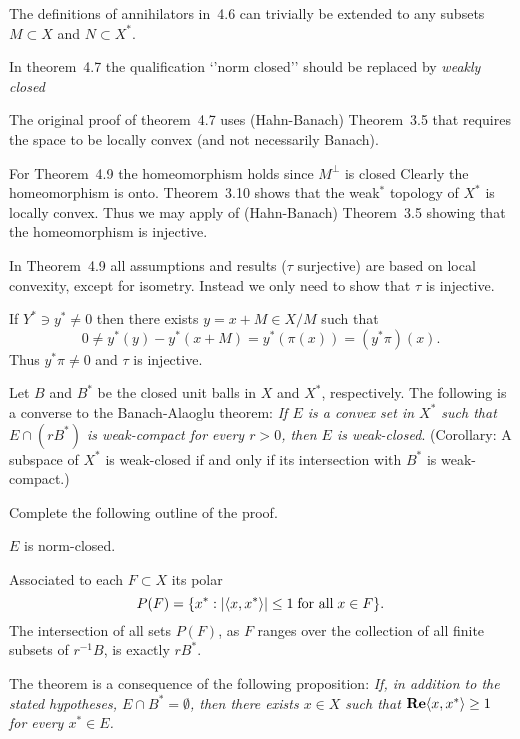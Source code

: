 \begin{enumerate}
The definitions of annihilators in~4.6 can trivially be extended
to any subsets \(M\subset X\) and \(N \subset X^*\).

In theorem~4.7 the qualification `'norm closed''
should be replaced by \emph{weakly closed}

The original proof of theorem~4.7 uses (Hahn-Banach) Theorem~3.5
that requires the space to be locally convex (and not necessarily Banach).

For Theorem~4.9 the homeomorphism holds since \(M^\perp\) is closed
Clearly the homeomorphism is onto. 
Theorem~3.10 shows that the weak\(^*\) topology of \(X^*\) is locally convex.
Thus we may apply of (Hahn-Banach) Theorem~3.5
showing that the homeomorphism is injective.

In Theorem~4.9 
all  assumptions and results (\(\tau\) surjective) 
are based on local convexity, except for isometry.
Instead we only need to show that \(\tau\) is injective.

If \(Y^*\ni y^* \neq 0\) then there exists
\(y = x+M \in X/M\) such that 
\begin{equation*}
0 \neq y^*(y) - y^*(x + M) = y^*(\pi(x)) = (y^*\pi)(x).
\end{equation*}
Thus \(y^*\pi \neq 0\) and \(\tau\) is injective.

\begin{excopy}
Let $B$ and \(B^*\) be the closed unit balls in $X$ and \(X^*\), respectively.
 The following is a
converse to the Banach-Alaoglu theorem:
\textsl{If $E$ is a convex set in \(X^*\) such that \(E \cap (rB^*)\)
is weak\upstar-compact
 for every \(r > 0\),
 then $E$ is
 weak\upstar-closed}.
 (Corollary: A subspace of \(X^*\)
is weak\upstar-closed if and only if its intersection with \(B^*\)
 is weak\upstar-compact.)

Complete the following outline of the proof.

\begin{itemize}

$E$ is norm-closed.

Associated to each \(F \subset X\) its polar
\begin{equation*}
P(F) = \{x^*: |\langle x, x^* \rangle| \leq 1 \;\textnormal{for all}\; x\in F\}.
\end{equation*}
The intersection of all sets \(P(F)\), as $F$ ranges over the collection of all
 finite subsets
of \(r^{-1}B\), is exactly \(rB^*\).

The theorem is a consequence of the following proposition:
\textsl{
 If, in addition to the
stated hypotheses, \(E \cap B^* = \emptyset\), then there exists \(x \in X\)
 such that \(\mathop{\bf Re}\nolimits \langle x, x^* \rangle \geq 1\) for
every \(x^* \in E\).
}


\end{itemize}
\end{excopy}
\end{enumerate}

